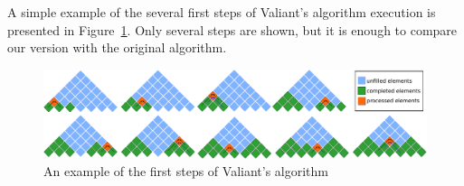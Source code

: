 A simple example of the several first steps of Valiant's algorithm execution is presented in Figure~\ref{fig3}.
Only several steps are shown, but it is enough to compare our version with the original algorithm.

\begin{figure}
\vspace{3mm}
 \begin{center}
 \includegraphics[width=12cm]{pictures/valbeg2.pdf}
    \caption{An example of the first steps of Valiant's algorithm}
    \label{fig3}
\end{center}
\vspace{-8mm}
\end{figure}




